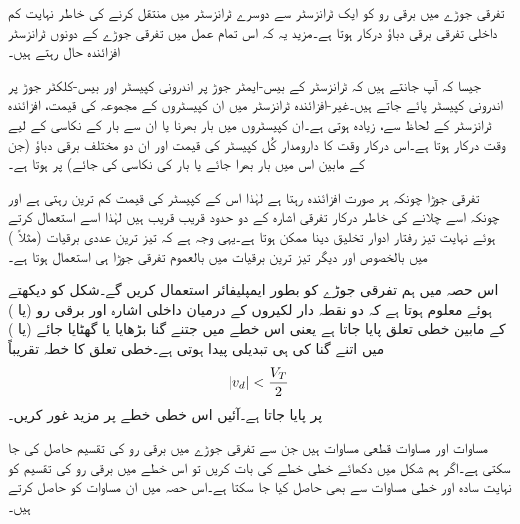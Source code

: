 تفرقی جوڑے میں برقی رو کو ایک ٹرانزسٹر سے دوسرے ٹرانزسٹر میں منتقل کرنے کی خاطر نہایت کم داخلی تفرقی برقی دباؤ درکار ہوتا ہے۔مزید یہ کہ اس تمام عمل میں تفرقی جوڑے کے دونوں ٹرانزسٹر افزائندہ حال رہتے ہیں۔

جیسا کہ آپ جانتے ہیں کہ ٹرانزسٹر کے بیس-ایمٹر جوڑ پر اندرونی کپیسٹر   اور بیس-کلکٹر  جوڑ پر اندرونی کپیسٹر   پائے جاتے ہیں۔غیر-افزائندہ ٹرانزسٹر میں ان کپیسٹروں کے مجموعہ کی قیمت، افزائندہ ٹرانزسٹر کے لحاظ سے، زیادہ ہوتی ہے۔ان کپیسٹروں میں بار بھرنا یا ان سے بار کے نکاسی کے لیے وقت درکار ہوتا ہے۔اس درکار وقت کا دارومدار کُل کپیسٹر کی قیمت اور ان دو مختلف برقی دباؤ (جن کے مابین اس میں بار بھرا جائے یا بار کی نکاسی کی جائے) پر ہوتا ہے۔

تفرقی جوڑا چونکہ ہر صورت افزائندہ رہتا ہے لہٰذا اس کے کپیسٹر کی قیمت کم ترین رہتی ہے اور چونکہ اسے چلانے کی خاطر درکار تفرقی اشارہ   کے دو حدود  قریب قریب ہیں لہٰذا اسے استعمال کرتے ہوئے نہایت تیز رفتار ادوار تخلیق دینا ممکن ہوتا ہے۔یہی وجہ ہے کہ تیز ترین عددی برقیات (مثلاً  ) میں بالخصوص اور دیگر تیز ترین برقیات میں بالعموم تفرقی جوڑا ہی استعمال ہوتا ہے۔



اس حصہ میں ہم تفرقی جوڑے کو بطور ایمپلیفائر استعمال کریں گے۔شکل   کو دیکھتے ہوئے معلوم ہوتا ہے کہ دو نقطہ دار لکیروں کے درمیان داخلی اشارہ  اور برقی رو   (یا ) کے مابین خطی تعلق پایا جاتا ہے یعنی اس خطے میں  جتنے گنا بڑھایا یا گھٹایا جائے  (یا  ) میں اتنے گنا کی ہی تبدیلی پیدا ہوتی ہے۔خطی تعلق کا خطہ تقریباً
\begin{align}
\abs{v_d} < \frac{V_T}{2}
\end{align}
پر پایا جاتا ہے۔آئیں اس خطی خطے پر مزید غور کریں۔

مساوات   اور مساوات   قطعی مساوات ہیں جن سے تفرقی جوڑے میں برقی رو کی تقسیم حاصل کی جا سکتی ہے۔اگر ہم شکل  میں دکھائے خطی خطے کی بات کریں تو اس خطے میں برقی رو کی تقسیم کو نہایت سادہ اور خطی مساوات سے بھی حاصل کیا جا سکتا ہے۔اس حصہ میں ان مساوات کو حاصل کرتے ہیں۔

